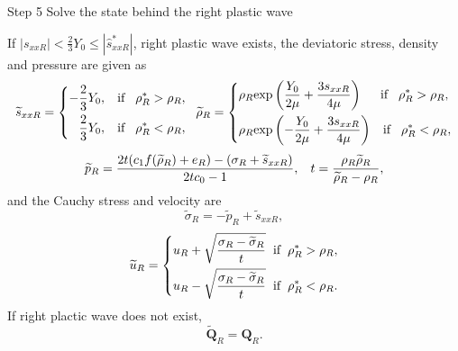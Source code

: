 \documentclass{article}
\numberwithin{equation}{section}
\numberwithin{table}{section}
\begin{document}
Step 5 Solve the state behind the right plastic wave

\vspace{0.3cm} \hspace{0.4cm}  If $|s_{xxR}| < \frac{2}{3}Y_0 \le |\hat{s}_{xxR}^*| $, right plastic wave exists, the deviatoric stress, density and pressure  are given as
\begin{equation*}
  \widetilde{s}_{xxR} =\left\{ \begin{aligned}
	  -\frac{2}{3}Y_0, \hspace{0.3cm} \text{if} \hspace{0.3cm} \rho_R^* > \rho_R,\\
	  \frac{2}{3}Y_0, \hspace{0.3cm} \text{if} \hspace{0.3cm} \rho_R^* < \rho_R,\\
	\end{aligned}\right.
	\hspace{0.2cm} \widetilde{\rho}_{R} = \left\{ \begin{aligned}
	  & \rho_R \text{exp}\left(\frac{Y_0}{2\mu}+\frac{3 s_{xxR}}{4\mu}\right)  \hspace{0.5cm} \text{if} \hspace{0.3cm} \rho_R^* > \rho_R,\\ 
& \rho_R \text{exp}\left(-\frac{Y_0}{2\mu}+\frac{3 s_{xxR}}{4\mu}\right) 
\hspace{0.3cm} \text{if} \hspace{0.3cm} \rho_R^* < \rho_R,\\ 
  \end{aligned}\right.
 \end{equation*}
\begin{equation*}
  \widetilde{p}_R= \frac{2t(c_1f(\widetilde{\rho}_R)+e_R)-(\sigma_R+\widetilde{s}_{xxR})}{2tc_0-1}, \hspace{0.3cm} 
t=\frac{\rho_R \widetilde{\rho}_R}{\widetilde{\rho}_R-\rho_R},
\end{equation*}
and the Cauchy stress and velocity are
\begin{equation*}
\widetilde{\sigma}_R = -\widetilde{p}_R+\widetilde{s}_{xxR},
\end{equation*}
\begin{equation*}
  \widetilde{u}_R= \left\{
  \begin{aligned}
	u_R+\sqrt{\frac{\sigma_R-\widetilde{\sigma}_R}{t}} \hspace{0.2cm} \text{if} \hspace{0.2cm} \rho_R^* >\rho_R,\\
	u_R-\sqrt{\frac{\sigma_R-\widetilde{\sigma}_R}{t}} \hspace{0.2cm} \text{if} \hspace{0.2cm} \rho_R^* <\rho_R.\\
\end{aligned} \right.
\end{equation*}
If right  plactic wave does not exist,
\begin{equation*}
  \widetilde{\bm{Q}}_R = \bm{Q}_R.
\end{equation*}
\end{document}
